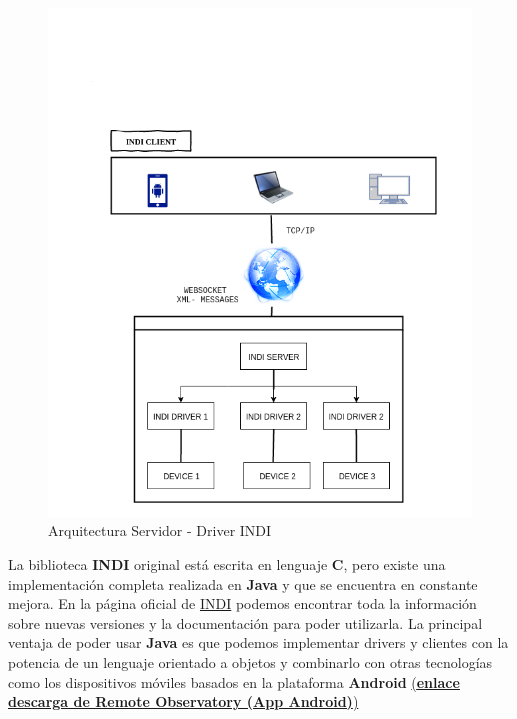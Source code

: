 \begin{figure}
	\centering
	\includegraphics[width=1\linewidth]{../images/indi-tophology}
	\caption[Arquitectura Servidor - Driver INDI]{Arquitectura Servidor - Driver INDI}
	\label{fig:indi-tophology}
\end{figure}


La biblioteca \textbf{INDI} original está escrita en lenguaje \textbf{C}, pero existe una implementación completa realizada en \textbf{Java} y que se encuentra en constante mejora. En la página oficial de \href{http://indilib.org/develop/indiforjava.html}{INDI} podemos encontrar toda la información sobre nuevas versiones y la documentación para poder utilizarla. La principal ventaja de poder usar \textbf{Java} es que podemos implementar drivers y clientes con la potencia de un lenguaje orientado a objetos y combinarlo con otras tecnologías como los dispositivos móviles basados en la plataforma \textbf{Android}  \href{https://play.google.com/store/apps/details?id=com.jtbenavente.jaime.indiandroidui&hl=es}{(\textbf{enlace descarga de Remote Observatory (App Android)})} 





